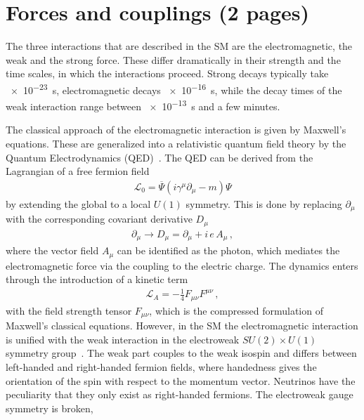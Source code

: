 
\section{Forces and couplings (2 pages)}
\label{sec:standardmodel:forces}

The three interactions that are described in the SM are the electromagnetic,
the weak and the strong force. These differ dramatically in their strength and
the time scales, in which the interactions proceed. Strong decays typically
take \SI{e-23}{\second}, electromagnetic decays \SI{e-16}{\second}, while the
decay times of the weak interaction range between \SI{e-13}{\second} and a few
minutes.

The classical approach of the electromagnetic interaction is given by
Maxwell's equations. These are generalized into a relativistic quantum field
theory by the Quantum Electrodynamics
(QED)~\cite{Tomonaga01081946,Schwinger-QED1,*Schwinger-QED2,Feynman-QED1,*Feynman-QED2,*Feynman-QED3}.
The QED can be derived from the Lagrangian of a free fermion field
\begin{align}
	\mathcal{L}_0 = \overline{\Psi} (i\gamma^\mu \partial_\mu - m) \Psi
\end{align}
by extending the global to a local $U(1)$ symmetry. This is done by replacing
$\partial_\mu$ with the corresponding covariant derivative $D_\mu$
\begin{align}
	\partial_\mu \to D_\mu = \partial_\mu + i\,e\,A_\mu\,,
\end{align}
where the vector field $A_\mu$ can be identified as the photon, which mediates
the electromagnetic force via the coupling to the electric charge. The
dynamics enters through the introduction of a kinetic term
\begin{align}
	\mathcal{L}_A = - \frac 14 F_{\mu\nu}F^{\mu\nu}\,,
\end{align}
with the field strength tensor $F_{\mu\nu}$, which is the compressed
formulation of Maxwell's classical equations. However, in the SM the
electromagnetic interaction is unified with the weak interaction in the
electroweak $SU(2)\times U(1)$ symmetry
group~\cite{Glashow:1961tr,Salam:1964ry,Weinberg:1967tq}. The weak part
couples to the weak isospin and differs between left-handed and right-handed
fermion fields, where handedness gives the orientation of the spin with
respect to the momentum vector. Neutrinos have the peculiarity that they only
exist as right-handed fermions. The electroweak gauge symmetry is broken,
